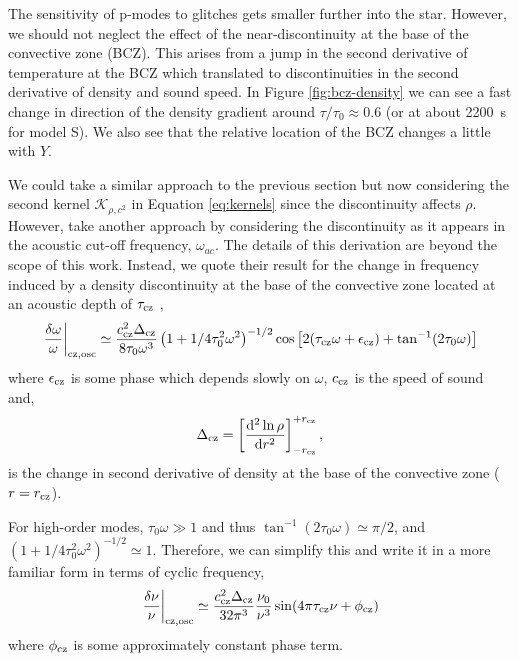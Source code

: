 The sensitivity of p-modes to glitches gets smaller further into the star. However, we should not neglect the effect of the near-discontinuity at the base of the convective zone (BCZ). This arises from a jump in the second derivative of temperature at the BCZ which translated to discontinuities in the second derivative of density and sound speed. In Figure \ref{fig:bcz-density} we can see a fast change in direction of the density gradient around \(\tau/\tau_0 \approx 0.6\) (or at about \SI{2200}{\second} for model S). We also see that the relative location of the BCZ changes a little with \(Y\).


We could take a similar approach to the previous section but now considering the second kernel \(\mathcal{K}_{\rho,c^2}\) in Equation \ref{eq:kernels} since the discontinuity affects \(\rho\). However, \citet{Houdek.Gough2007} take another approach by considering the discontinuity as it appears in the acoustic cut-off frequency, \(\omega_{ac}\). The details of this derivation are beyond the scope of this work. Instead, we quote their result for the change in frequency induced by a density discontinuity at the base of the convective zone located at an acoustic depth of \(\tau_{{\mathrm{cz}}}\) \citep[cf.][Eq. 17]{Houdek.Gough2007},
%
\begin{equation}
    \left.\frac{\delta\omega}{\omega}\right|_{{\mathrm{cz}},\mathrm{osc}} \simeq \frac{c_{{\mathrm{cz}}}^2\Delta_{{\mathrm{cz}}}}{8\tau_0 \omega^3} \left(1 + {1}/{4\tau_0^2\omega^2}\right)^{-1/2} \cos\left[2(\tau_{{\mathrm{cz}}} \omega + \epsilon_{{\mathrm{cz}}}) + \tan^{-1}(2\tau_0\omega)\right]
\end{equation}
%
where \(\epsilon_{{\mathrm{cz}}}\) is some phase which depends slowly on \(\omega\), \(c_{{\mathrm{cz}}}\) is the speed of sound and,
%
\begin{equation}
    \Delta_{{\mathrm{cz}}} = \left[\frac{\mathrm{d}^2 \ln\rho}{\mathrm{d} r^2}\right]_{-r_{{\mathrm{cz}}}}^{+r_{{\mathrm{cz}}}},
\end{equation}
%
is the change in second derivative of density at the base of the convective zone (\(r = r_{{\mathrm{cz}}}\)).

For high-order modes, \(\tau_0 \omega \gg 1\) and thus \(\tan^{-1}(2\tau_0\omega) \simeq \pi/2\), and \((1 + {1}/{4\tau_0^2\omega^2})^{-1/2} \simeq 1\). Therefore, we can simplify this and write it in a more familiar form in terms of cyclic frequency,
%
\begin{equation}
    \left.\frac{\delta\nu}{\nu}\right|_{{\mathrm{cz}},\mathrm{osc}} \simeq \frac{c_{{\mathrm{cz}}}^2\Delta_{{\mathrm{cz}}}}{32\pi^3}\frac{\nu_0}{\nu^3} \sin(4\pi\tau_{{\mathrm{cz}}}\nu + \phi_{{\mathrm{cz}}}) \label{eq:bcz-osc}
\end{equation}
%
where \(\phi_{{\mathrm{cz}}}\) is some approximately constant phase term.

